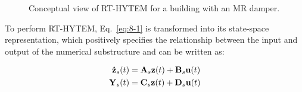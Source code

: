 \begin{figure}[!ht]
\centering
{}
\caption{Conceptual view of RT-HYTEM for a building with an MR damper.}
\label{fig:8-1}
\end{figure}

To perform RT-HYTEM, Eq.~\eqref{eq:8-1} is transformed into its state-space representation, which positively specifies the relationship between the input and output of the numerical substructure and can be written as:

\begin{equation}\label{eq:8-2}
\begin{aligned}
\mathbf{\dot{z}}_{s}(t) &= \mathbf{A}_{s}\mathbf{z}(t) + \mathbf{B}_{s}\mathbf{u}(t)\\
\mathbf{Y}_{s}(t) &=\mathbf{C}_{s}\mathbf{z}(t) + \mathbf{D}_{s}\mathbf{u}(t)
\end{aligned}
\end{equation}

